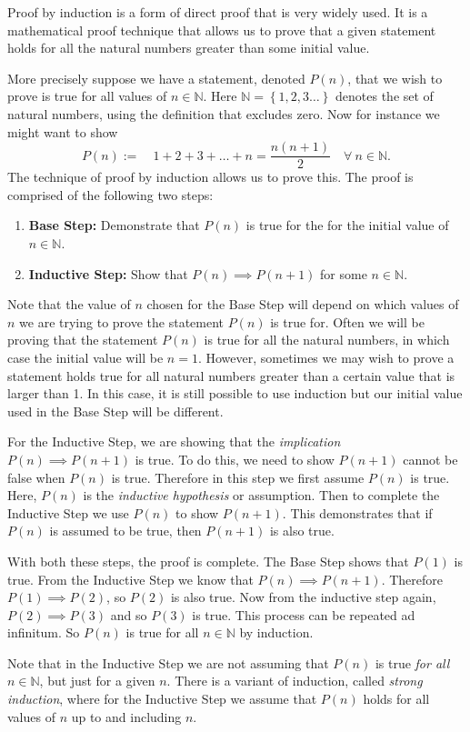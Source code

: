 Proof by induction is a form of direct proof that is very widely used. It is a mathematical proof technique that allows us to prove that a given statement holds for all the natural numbers greater than some initial value.

More precisely suppose we have a statement, denoted $P(n)$, that we wish to prove is true for all values of $n \in \mathbb{N}$. Here $\mathbb{N}=\left\{1,2,3\dots\right\}$ denotes the set of natural numbers, using the definition that excludes zero. Now for instance we might want to show
\begin{equation} \label{eq:ex1}
 P(n):=\quad 1+2+3+\dots+n=\frac{n(n+1)}{2}\quad\forall ~n\in\mathbb{N}.
\end{equation}
The technique of proof by induction allows us to prove this. The proof is comprised of the following two steps:
\begin{enumerate}
 \item {\bf Base Step:} Demonstrate that $P(n)$ is true for the for the initial value of $n \in \mathbb{N}$. 
 \item {\bf Inductive Step:} Show that $P(n) \implies P(n+1)$ for some $n \in \mathbb{N}$.
\end{enumerate}

Note that the value of $n$ chosen for the Base Step will depend on which values of $n$ we are trying to prove the statement $P(n)$ is true for. Often we will be proving that the statement $P(n)$ is true for all the natural numbers, in which case the initial value will be $n=1$. However, sometimes we may wish to prove a statement holds true for all natural numbers greater than a certain value that is larger than 1. In this case, it is still possible to use induction but our initial value used in the Base Step will be different.

For the Inductive Step, we are showing that the {\em implication} $P(n) \implies P(n+1)$ is true. To do this, we need to show $P(n+1)$ cannot be false when $P(n)$ is true. Therefore in this step we first assume $P(n)$ is true. Here, $P(n)$ is the {\em inductive hypothesis} or assumption. Then to complete the Inductive Step we use $P(n)$ to show $P(n+1)$. This demonstrates that if $P(n)$ is assumed to be true, then $P(n+1)$ is also true. 

With both these steps, the proof is complete. The Base Step shows that $P(1)$ is true. From the Inductive Step we know that $P(n)\implies P(n+1)$. Therefore $P(1)\implies P(2)$, so $P(2)$ is also true. Now from the inductive step again, $P(2)\implies P(3)$ and so $P(3)$ is true. This process can be repeated ad infinitum. So $P(n)$ is true for all $n \in \mathbb{N}$ by induction.

Note that in the Inductive Step we are not assuming that $P(n)$ is true {\em for all} $n\in \mathbb{N}$, but just for a given $n$. There is a variant of induction, called {\em strong induction}, where for the Inductive Step we assume that $P(n)$ holds for all values of $n$ up to and including $n$.